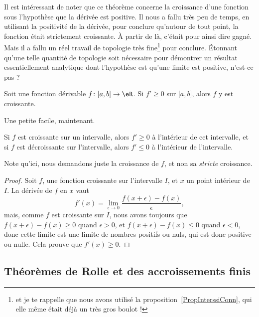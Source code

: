 Il est intéressant de noter que ce théorème concerne la croissance d'une fonction sous l'hypothèse que la dérivée est positive. Il nous a fallu très peu de temps, en utilisant la positivité de la dérivée, pour conclure qu'autour de tout point, la fonction était strictement croissante. À partir de là, c'était pour ainsi dire gagné. Mais il a fallu un réel travail de topologie très fine\footnote{et je te rappelle que nous avons utilisé la proposition~\ref{PropInterssiConn}, qui elle même était déjà un très gros boulot !} pour conclure. Étonnant qu'une telle quantité de topologie soit nécessaire pour démontrer un résultat essentiellement analytique dont l'hypothèse est qu'une limite est positive, n'est-ce pas ?


\begin{proposition}     \label{PROPooRJRUooOtIKrO}
    Soit une fonction dérivable \( f\colon \mathopen[ a , b \mathclose]\to \eR\). Si \( f'\geq 0\) sur \( \mathopen[ a , b \mathclose]\), alors \( f\) y est croissante.
\end{proposition}

Une petite facile, maintenant.
\begin{proposition}
	Si \( f\) est croissante sur un intervalle, alors \( f'\geq 0\) à l'intérieur de cet intervalle, et si \( f\) est décroissante sur l'intervalle, alors \( f'\leq 0\) à l'intérieur de l'intervalle.
\end{proposition}

Note qu'ici, nous demandons juste la croissance de \( f\), et non sa \emph{stricte} croissance.

\begin{proof}
	Soit \( f\), une fonction croissante sur l'intervalle \( I\), et \( x\) un point intérieur de \( I\). La dérivée de \( f\) en \( x\) vaut
	\begin{equation}
		f'(x)=\lim_{\epsilon\to 0}\frac{ f(x+\epsilon)-f(x) }{\epsilon},
	\end{equation}
	mais, comme \( f\) est croissante sur \( I\), nous avons toujours que \( f(x+\epsilon)-f(x)\geq0\) quand \( \epsilon>0\), et \( f(x+\epsilon)-f(x)\leq0\) quand \( \epsilon<0\), donc cette limite est une limite de nombres positifs ou nuls, qui est donc positive ou nulle. Cela prouve que \( f'(x)\geq 0\).
\end{proof}

\subsection{Théorèmes de Rolle et des accroissements finis}

